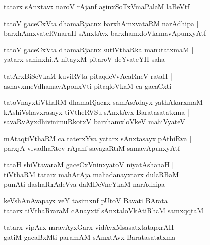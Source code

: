 \documentclass[twoside,12pt,openright]{book}
\newcounter{shloka}[chapter]
\begin{document}
\begin{shloka}
tatarx sAnxtavx naroV rAjanf aginxSoTxVmaPalaM laBeVtf
\end{shloka}
 
\begin{shloka}
tatoV gaceCxVta dhamaRjacnx barxhAmxvataRM narAdhipa |\\
barxhAmxvateRVnaraH sAnxtAvx barxhamxloVkamavApunxyAtf 
\end{shloka} 

\begin{shloka}
tatoV gaceCxVta dhamaRjacnx sutiVthaRka manutatxmaM |\\
yatarx saninxhitA nitayxM pitaroV deYvateYH saha
\end{shloka}

\begin{shloka}
tatArxBiSeVkaM kuviRVta pitaqdeVvAcaRneV rataH |\\
ashavxmeVdhamavAponxVti pitaqloVkaM ca gacaCxti 
\end{shloka}

\begin{shloka}
tatoVnayxtiVthaRM dhamaRjacnx samAsAdayx yathAkarxmaM |\\
kAshiVshavxrasayx tiVtheRVSu sAnxtAvx Baratasatatxma |\\
savaRvAyxdhivinimuRkotxV barxhamxloVkeV mahiVyateV 
\end{shloka}

\begin{shloka}
mAtaqtiVthaRM ca taterxYva yatarx sAnxtasayx pAthiRva |\\
parxjA vivadhaRtev rAjanf savagaRtiM samavApunxyAtf 
\end{shloka}

\begin{shloka}
tataH shiVtavanaM gaceCxVninxyatoV niyatAshanaH |\\
tiVthaRM tatarx mahArAja mahadanayxtarx dulaRBaM |\\
punAti dashaRnAdeVva daMDeVneYkaM narAdhipa
\end{shloka}

\begin{shloka}
keVshAnAvapayx veY tasimxnf pUtoV Bavati BArata |\\
tatarx tiVthaRvaraM cAnayxtf sAnxtaloVkAtiRhaM samxqqtaM 
\end{shloka}

\begin{shloka}
tatarx vipArx naravAyxGarx vidAvxMsasatxtatapxrAH |\\
gatiM gacaBxMti paramAM sAmxtAvx Baratasatatxma 
\end{shloka}
\end{document}
